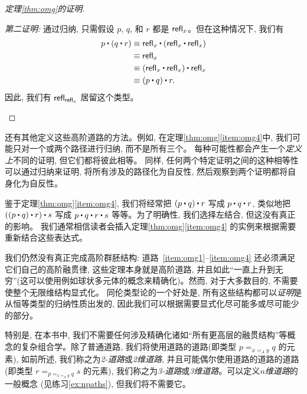 \begin{proof}[定理\ref{thm:omg}的证明]
\begin{enumerate}
    \mentalpause

    \noindent \emph{第二证明:} 通过归纳, 只需假设 $p$, $q$, 和 $r$ 都是 $\mathsf{refl}_{x}$。但在这种情况下, 我们有
    \begin{align*}
      p\ct (q\ct r)
      &\jdeq \refl{x}\ct(\refl{x}\ct \refl{x})\\
      &\jdeq \refl{x}\\
      &\jdeq (\refl{x}\ct \refl x)\ct \refl x\\
      &\jdeq (p\ct q)\ct r.
    \end{align*}
    因此, 我们有 $\mathsf{refl}_{\mathsf{refl}_{x}}$ 居留这个类型。 \qedhere
  \end{enumerate}
\end{proof}

\begin{rmk}
  还有其他定义这些高阶道路的方法。例如, 在定理\ref{thm:omg}\ref{item:omg4}中, 我们可能只对一个或两个路径进行归纳, 而不是所有三个。
  每种可能性都会产生一个\emph{定义上}不同的证明, 但它们都将彼此相等。
  同样, 任何两个特定证明之间的这种相等性可以通过归纳来证明, 将所有涉及的路径化为自反性, 然后观察到两个证明都将自身化为自反性。
\end{rmk}


鉴于定理\ref{thm:omg}\ref{item:omg4}, 我们将经常把 $(p\ct q)\ct r$ 写成 $p\ct q\ct r$, 
类似地把 $((p\ct q)\ct r)\ct s$ 写成 $p\ct q\ct r \ct s$ 等等。为了明确性, 我们选择左结合, 但这没有真正的影响。
我们通常相信读者会插入定理\ref{thm:omg}\ref{item:omg4} 的实例来根据需要重新结合这些表达式。

我们仍然没有真正完成高阶群胚结构: 道路~\ref{item:omg1}--\ref{item:omg4} 还必须满足它们自己的高阶融贯律, 这些定理本身就是高阶道路,
%
%
%
%
并且如此``一直上升到无穷''(这可以使用例如球状多元体的概念来精确化)。然而, 对于大多数目的, 不需要使整个无限维结构显式化。
同伦类型论的一个好处是, 所有这些结构都可以\emph{证明}是从恒等类型的归纳性质出发的, 因此我们可以根据需要显式化尽可能多或尽可能少的部分。

特别是, 在本书中, 我们不需要任何涉及精确化诸如``所有更高层的融贯结构''等概念的复杂组合学。除了普通道路, 
我们将使用道路的道路(即类型 $p =_{x=_A y} q$ 的元素), 如前所述, 我们称之为\emph{2-道路}或\emph{2维道路}, 
并且可能偶尔使用道路的道路的道路(即类型 $r = _{p =_{x=_A y} q} s$ 的元素), 我们称之为\emph{3-道路}或\emph{3维道路}。可以定义\emph{$n$维道路}的一般概念
%
%
%
%
(见练习\ref{ex:npaths}), 但我们将不需要它。

